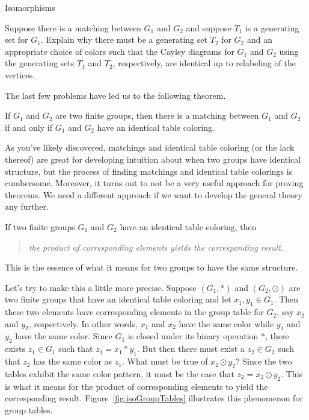 \begin{section}{Isomorphisms}
\begin{problem}
Suppose there is a matching between $G_1$ and $G_2$ and suppose $T_1$ is a generating set for $G_1$. Explain why there must be a generating set $T_2$ for $G_2$ and an appropriate choice of colors such that the Cayley diagrams for $G_1$ and $G_2$ using the generating sets $T_1$ and $T_2$, respectively, are identical up to relabeling of the vertices.
\end{problem}

The last few problems have led us to the following theorem.

\begin{theorem}
If $G_1$ and $G_2$ are two finite groups, then there is a matching between $G_1$ and $G_2$ if and only if $G_1$ and $G_2$ have an identical table coloring.
\end{theorem}

As you've likely discovered, matchings and identical table coloring (or the lack thereof) are great for developing intuition about when two groups have identical structure, but the process of finding matchings and identical table colorings is cumbersome.  Moreover, it turns out to not be a very useful approach for proving theorems.  We need a different approach if we want to develop the general theory any further. 

If two finite groups $G_1$ and $G_2$ have an identical table coloring, then
\begin{quotation}
\emph{the product of corresponding elements yields the corresponding result.}
\end{quotation}
This is the essence of what it means for two groups to have the same structure.  

Let's try to make this a little more precise.  Suppose $(G_1,*)$ and $(G_2,\odot)$ are two finite groups that have an identical table coloring and let $x_1,y_1\in G_1$.  Then these two elements have corresponding elements in the group table for $G_2$, say $x_2$ and $y_2$, respectively.  In other words, $x_1$ and $x_2$ have the same color while $y_1$ and $y_2$ have the same color.  Since $G_1$ is closed under its binary operation $*$, there exists $z_1\in G_1$ such that $z_1=x_1*y_1$.  But then there must exist a $z_2\in G_2$ such that $z_2$ has the same color as $z_1$.  What must be true of $x_2\odot y_2$?  Since the two tables exhibit the same color pattern, it must be the case that $z_2=x_2\odot y_2$.  This is what it means for the product of corresponding elements to yield the corresponding result.  Figure~\ref{fig:isoGroupTables} illustrates this phenomenon for group tables.


\end{section}
